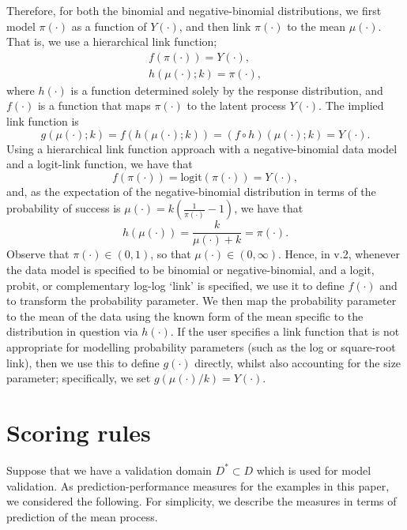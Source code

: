 \documentclass[article]{jss}
\newcommand{\logit}[1]{\text{logit}\!\left(#1\right)} %
\begin{document}
\begin{appendix}
Therefore, for both the binomial and negative-binomial distributions, we first model $\pi(\cdot)$ as a function of $Y(\cdot)$, and then link $\pi(\cdot)$ to the mean $\mu(\cdot)$. 
That is, we use a hierarchical link function;
\begin{gather*}
    f(\pi(\cdot)) = Y(\cdot),\\
    h(\mu(\cdot); k) = \pi(\cdot), 
\end{gather*}
where $h(\cdot)$ is a function determined solely by the response distribution, and $f(\cdot)$ is a function that maps $\pi(\cdot)$ to the latent process $Y(\cdot)$.  
The implied link function is
\[
g(\mu(\cdot); k) = f(h(\mu(\cdot); k)) = (f \circ h)(\mu(\cdot); k) = Y(\cdot).
\]
Using a hierarchical link function approach with a negative-binomial data model and a logit-link function, we have that
\[
f(\pi(\cdot)) = \logit{\pi(\cdot)} = Y(\cdot),
\]
and, as the expectation of the negative-binomial distribution in terms of the probability of success is $\mu(\cdot) = k\left(\frac{1}{\pi(\cdot)} - 1\right)$, we have that
\[
h(\mu(\cdot)) = \frac{k}{\mu(\cdot) + k} = \pi(\cdot).
\]
Observe that $\pi(\cdot) \in (0, 1)$, so that $\mu(\cdot) \in (0, \infty)$. 
Hence, in  v.2, whenever the data model is specified to be binomial or negative-binomial, and a logit, probit, or complementary log-log `link' is specified, we use it to define $f(\cdot)$ and to transform the probability parameter. 
We then map the probability parameter to the mean of the data using the known form of the mean specific to the distribution in question via $h(\cdot)$. 
If the user specifies a link function  that is not appropriate for modelling probability parameters (such as the log or square-root link), then we use this to define $g(\cdot)$ directly, whilst also accounting for the size parameter; specifically, we set $g(\mu(\cdot) / k) = Y(\cdot)$.


\section{Scoring rules}\label{app:ScoringRules}

Suppose that we have a validation domain $D^* \subset D$ which is used for model validation.
As prediction-performance measures for the examples in this paper, we considered the following. 
For simplicity, we describe the measures in terms of prediction of the mean process.



\end{appendix}
\end{document}

